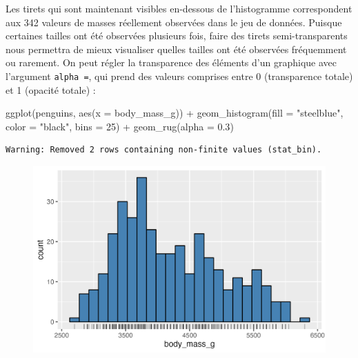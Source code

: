 \documentclass[
  letterpaper,
  DIV=11,
  numbers=noendperiod]{scrreprt}
\newenvironment{Shaded}{\begin{snugshade}}{\end{snugshade}}
\newcommand{\AttributeTok}[1]{\textcolor[rgb]{0.40,0.45,0.13}{#1}}
\newcommand{\DecValTok}[1]{\textcolor[rgb]{0.68,0.00,0.00}{#1}}
\newcommand{\FloatTok}[1]{\textcolor[rgb]{0.68,0.00,0.00}{#1}}
\newcommand{\FunctionTok}[1]{\textcolor[rgb]{0.28,0.35,0.67}{#1}}
\newcommand{\NormalTok}[1]{\textcolor[rgb]{0.00,0.23,0.31}{#1}}
\newcommand{\SpecialCharTok}[1]{\textcolor[rgb]{0.37,0.37,0.37}{#1}}
\newcommand{\StringTok}[1]{\textcolor[rgb]{0.13,0.47,0.30}{#1}}
\begin{document}
Les tirets qui sont maintenant visibles en-dessous de l'histogramme
correspondent aux 342 valeurs de masses réellement observées dans le jeu
de données. Puisque certaines tailles ont été observées plusieurs fois,
faire des tirets semi-transparents nous permettra de mieux visualiser
quelles tailles ont été observées fréquemment ou rarement. On peut
régler la transparence des éléments d'un graphique avec l'argument
\texttt{alpha\ =}, qui prend des valeurs comprises entre 0 (transparence
totale) et 1 (opacité totale) :

\begin{Shaded}
\begin{Highlighting}[]
\FunctionTok{ggplot}\NormalTok{(penguins, }\FunctionTok{aes}\NormalTok{(}\AttributeTok{x =}\NormalTok{ body\_mass\_g)) }\SpecialCharTok{+}
  \FunctionTok{geom\_histogram}\NormalTok{(}\AttributeTok{fill =} \StringTok{"steelblue"}\NormalTok{, }\AttributeTok{color =} \StringTok{"black"}\NormalTok{,}
                 \AttributeTok{bins =} \DecValTok{25}\NormalTok{) }\SpecialCharTok{+}
  \FunctionTok{geom\_rug}\NormalTok{(}\AttributeTok{alpha =} \FloatTok{0.3}\NormalTok{)}
\end{Highlighting}
\end{Shaded}

\begin{verbatim}
Warning: Removed 2 rows containing non-finite values (stat_bin).
\end{verbatim}

\begin{figure}[H]

{\centering \includegraphics{./03-visualization_files/figure-pdf/unnamed-chunk-21-1.png}

}

\end{figure}
\end{document}
